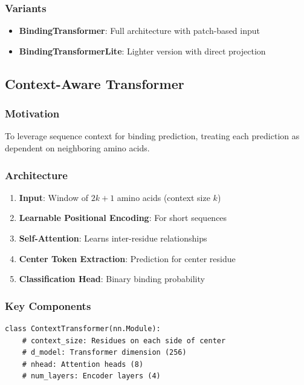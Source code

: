 \documentclass[11pt,a4paper]{article}
\begin{document}
\subsubsection{Variants}
\begin{itemize}
    \item \textbf{BindingTransformer}: Full architecture with patch-based input
    \item \textbf{BindingTransformerLite}: Lighter version with direct projection
\end{itemize}

\subsection{Context-Aware Transformer}

\subsubsection{Motivation}
To leverage sequence context for binding prediction, treating each prediction as dependent on neighboring amino acids.

\subsubsection{Architecture}
\begin{enumerate}
    \item \textbf{Input}: Window of $2k+1$ amino acids (context size $k$)
    \item \textbf{Learnable Positional Encoding}: For short sequences
    \item \textbf{Self-Attention}: Learns inter-residue relationships
    \item \textbf{Center Token Extraction}: Prediction for center residue
    \item \textbf{Classification Head}: Binary binding probability
\end{enumerate}

\subsubsection{Key Components}
\begin{verbatim}
class ContextTransformer(nn.Module):
    # context_size: Residues on each side of center
    # d_model: Transformer dimension (256)
    # nhead: Attention heads (8)
    # num_layers: Encoder layers (4)
\end{verbatim}
\end{document}
